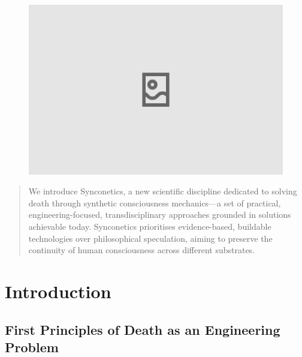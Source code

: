\documentclass[10pt]{article}
\begin{document}
\begin{sloppypar}

  \begin{figure}[ht]
    \centering
    \includegraphics[width=\textwidth]{figures/cover.png}
    \label{fig:cover}
  \end{figure}
  \newpage


  \begin{abstract}
    We introduce Synconetics, a new scientific discipline dedicated to solving death through synthetic consciousness mechanics—a set of practical, engineering-focused, transdisciplinary approaches grounded in solutions achievable today. Synconetics prioritises evidence-based, buildable technologies over philosophical speculation, aiming to preserve the continuity of human consciousness across different substrates.
  \end{abstract}

  \pagebreak
  \tableofcontents
  \pagebreak


  \section{Introduction}
  \label{sec:introduction}

  \subsection{First Principles of Death as an Engineering Problem}
  \label{sec:first-principles}


\end{sloppypar}
\end{document}
